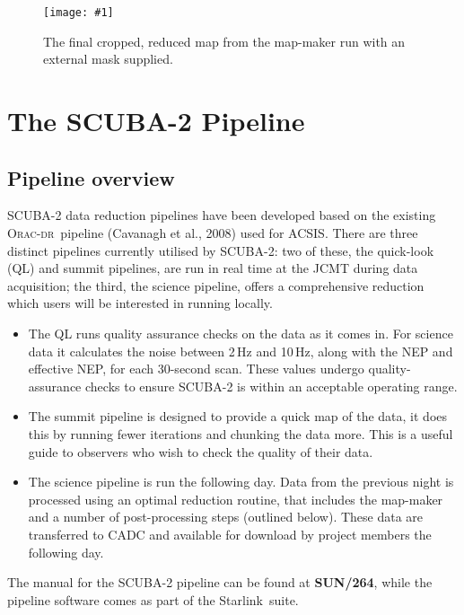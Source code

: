 \documentclass[twoside,11pt]{article}
\newcommand{\htmladdnormallink}[2]{#1}
\newcommand{\htmladdimg}[1]{}
\newcommand{\xref}[3]{#1}
\newcommand{\xlabel}[1]{}
\renewcommand{\_}{\texttt{\symbol{95}}}
\newcommand{\starlink}{\htmladdnormallink{Starlink}{http://starlink.jach.hawaii.edu}}
\newcommand{\oracdr}{\htmladdnormallink{\textsc{Orac-dr}}{http://www.oracdr.org/oracdr}}
\newcommand{\pipelinesun}{\xref{\textbf{SUN/264}}{sun264}{}}
\newcommand{\myfig}[6]{
  \begin{figure}#2
    \centering\texttt{[image: \#1]}
    \typeout{#1 inserted on page \arabic{page}}
    \caption[#5]{\label{#4}\small #6}
  \end{figure}
}
\newcommand{\myfig}[6]{
    \label{#4} \htmladdimg{#1.png}\\
    \\
    Figure: #6\\
  }
\begin{document}
\myfig{sc21_gal12_crop}{[t!]}{width=0.8\hsize}{fig:crop_map}{
  Galactic example: cropped final map}{
  The final cropped, reduced map from the map-maker run with
  an external mask supplied.
}


\clearpage
\section{\xlabel{pipeline}The SCUBA-2 Pipeline}
\label{sec:pipe}
\subsection{\xlabel{pl_overview}Pipeline overview}

SCUBA-2 data reduction pipelines have been developed based on the
existing \oracdr\ pipeline (Cavanagh et al., 2008\cite{oracdr}) used
for ACSIS. There are three distinct pipelines currently utilised by
SCUBA-2: two of these, the quick-look (QL) and summit pipelines, are
run in real time at the JCMT during data acquisition; the third, the science
pipeline, offers a comprehensive reduction which users will be
interested in running locally.

\begin{itemize}
\item The QL runs quality assurance checks on the data as it comes in.
For science data it calculates the noise between 2\,Hz and 10\,Hz,
along with the NEP and effective NEP, for each 30-second scan. These
values undergo quality-assurance checks to ensure SCUBA-2 is within
an acceptable operating range.
\item The summit pipeline is designed to provide a quick map of the
data, it does this by running fewer iterations and chunking the data
more. This is a useful guide to observers who wish to check the
quality of their data.
\item The science pipeline is run the following day. Data from the
previous night is processed using an optimal reduction routine, that
includes the map-maker and a number of post-processing steps (outlined
below). These data are transferred to CADC and available for download
by project members the following day.
\end{itemize}

The manual for the SCUBA-2 pipeline can be found at \pipelinesun,
while the pipeline software comes as part of the \starlink\ suite.
\end{document}
